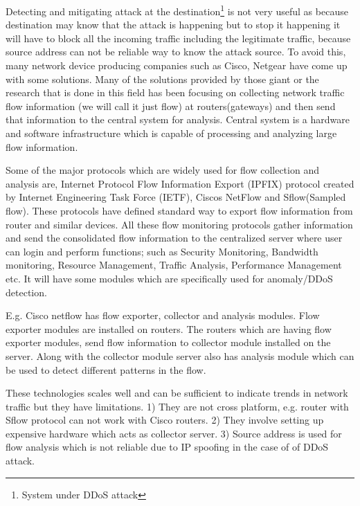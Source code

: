 \documentclass[10pt,oneside,a4paper]{article}
\begin{document}
Detecting and mitigating attack at the destination\footnote{System under DDoS attack} is not very useful as because destination may know that the attack is happening but to stop it happening it will have to block all the incoming traffic including the legitimate traffic, because source address can not be reliable way to know the attack source. To avoid this, many network device producing companies such as Cisco, Netgear have come up with some solutions. Many of the solutions provided by those giant or the research that is done in this field has been focusing on collecting network traffic flow information\cite{networkTrafficFlow} (we will call it just flow) at routers(gateways) and then send that information to the central system for analysis. Central system is a hardware and software infrastructure which is capable of processing and analyzing large flow information.\par

Some of the major protocols which are widely used for flow collection and analysis are, Internet Protocol Flow Information Export (IPFIX) protocol created by Internet Engineering Task Force (IETF), Ciscos NetFlow\cite{cisconetflow} and Sflow(Sampled flow)\cite{sflow}. These protocols have defined standard way to export flow information from router and similar devices. All these flow monitoring protocols gather information and send the consolidated flow information to the centralized server where user can login and perform functions; such as Security Monitoring, Bandwidth monitoring, Resource Management, Traffic Analysis, Performance Management etc. It will have some modules which are specifically used for anomaly/DDoS detection.\par

E.g. Cisco netflow has flow exporter, collector and analysis modules. Flow exporter modules are installed on routers. The routers which are having flow exporter modules, send flow information to collector module installed on the server. Along with the collector module server also has analysis module which can be used to detect different patterns in the flow.\par

These technologies scales well and can be sufficient to indicate trends in network traffic but they have limitations. 1) They are not cross platform, e.g. router with Sflow protocol can not work with Cisco routers. 2) They involve setting up expensive hardware which acts as collector server. 3) Source address is used for flow analysis which is not reliable due to IP spoofing in the case of of DDoS attack.\par
\end{document}
